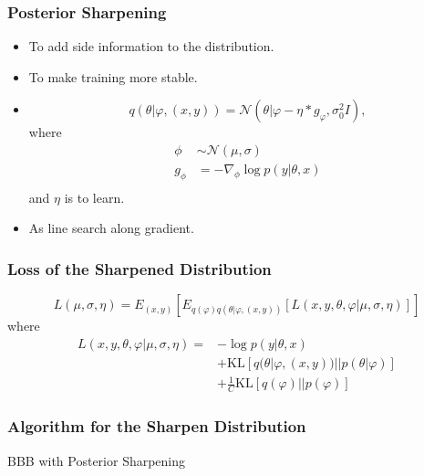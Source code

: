\begin{frame}
  \frametitle{Posterior Sharpening}  
  \begin{itemize}
  \item To add side information to the distribution.
  \item To make training more stable.
  \item
    \begin{equation*}
      q(\theta | \varphi, (x,y)) = \mathcal{N}(\theta|\varphi - \eta * g_{\varphi} , \sigma_0^2I),
    \end{equation*}
    where
    \begin{align*}
      \phi &\sim \mathcal{N}(\mu, \sigma) \\
      g_\phi &= -\nabla_\phi \log p(y|\theta,x) \\    
    \end{align*}
    and $\eta$ is to learn.
  \item As line search along gradient.
\end{itemize}
\end{frame}


\begin{frame}
  \frametitle{Loss of the Sharpened Distribution}
  \begin{equation}
    L(\mu,\sigma,\eta)=E_{(x,y)}[E_{q(\varphi)q(\theta | \varphi, (x,y))}  [L(x,y, \theta,\varphi|\mu,\sigma,\eta)]]     \label{eq:sharpen-loss}
  \end{equation}
  where
  \begin{align*}
    L(x,y, \theta,\varphi|\mu,\sigma,\eta)
    =& -\log p(y|\theta,x) \\
     & + \mathrm{KL}[q(\theta|\varphi, (x,y)) || p(\theta|\varphi)] \\
     & + \frac{1}{C} \mathrm{KL}[q(\varphi) || p(\varphi)]
  \end{align*}
\end{frame}


\begin{frame}
  \frametitle{Algorithm for the Sharpen Distribution}
  \begin{algorithm}[H]
    \caption{BBB with Posterior Sharpening}
    \label{alg:l2l}
    \begin{algorithmic}
	\end{algorithmic}
  \end{algorithm}
\end{frame}


